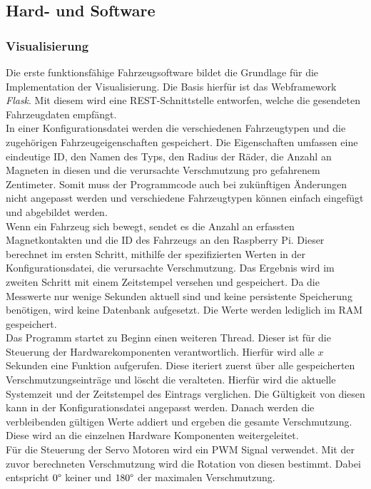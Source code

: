 \documentclass[.../Dokumentation.tex]{subfiles}
\begin{document}
    \subsection{Hard- und Software}
    \label{sec-ita3-hardware}
    \subsubsection*{Visualisierung}
    Die erste funktionsfähige Fahrzeugsoftware bildet die Grundlage für die Implementation der Visualisierung. Die Basis hierfür ist das Webframework \emph{Flask}. Mit diesem wird eine REST-Schnittstelle entworfen, welche die gesendeten Fahrzeugdaten empfängt. \\
    In einer Konfigurationsdatei werden die verschiedenen Fahrzeugtypen und die zugehörigen Fahrzeugeigenschaften gespeichert. Die Eigenschaften umfassen eine eindeutige ID, den Namen des Typs, den Radius der Räder, die Anzahl an Magneten in diesen und die verursachte Verschmutzung pro gefahrenem Zentimeter. Somit muss der Programmcode auch bei zukünftigen Änderungen nicht angepasst werden und verschiedene Fahrzeugtypen können einfach eingefügt und abgebildet werden.\\
    Wenn ein Fahrzeug sich bewegt, sendet es die Anzahl an erfassten Magnetkontakten und die ID des Fahrzeugs an den Raspberry Pi. Dieser berechnet im ersten Schritt, mithilfe der spezifizierten Werten in der Konfigurationsdatei, die verursachte Verschmutzung. Das Ergebnis wird im zweiten Schritt mit einem Zeitstempel versehen und gespeichert. Da die Messwerte nur wenige Sekunden aktuell sind und keine persistente Speicherung benötigen, wird keine Datenbank aufgesetzt. Die Werte werden lediglich im RAM gespeichert.\\
    Das Programm startet zu Beginn einen weiteren Thread. Dieser ist für die Steuerung der Hardwarekomponenten verantwortlich. Hierfür wird alle $x$ Sekunden eine Funktion aufgerufen. Diese iteriert zuerst über alle gespeicherten Verschmutzungseinträge und löscht die veralteten. Hierfür wird die aktuelle Systemzeit und der Zeitstempel des Eintrags verglichen. Die Gültigkeit von diesen kann in der Konfigurationsdatei angepasst werden. Danach werden die verbleibenden gültigen Werte addiert und ergeben die gesamte Verschmutzung. Diese wird an die einzelnen Hardware Komponenten weitergeleitet.\\
    Für die Steuerung der Servo Motoren wird ein PWM Signal verwendet. Mit der zuvor berechneten Verschmutzung wird die Rotation von diesen bestimmt. Dabei entspricht $0 \degree$ keiner und $180 \degree$ der maximalen Verschmutzung.\\
\end{document}
